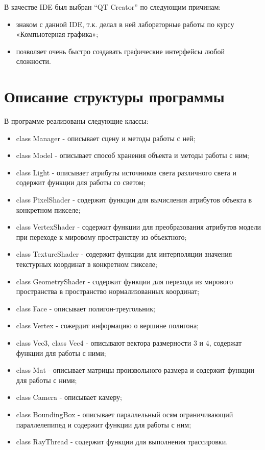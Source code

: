 \documentclass[12pt,a4paper,oneside]{report}
\begin{document}
	 В качестве IDE был выбран “QT Creator” по следующим причинам: 
	
	\begin{itemize}
		\item знаком с данной IDE, т.к. делал в ней лабораторные работы по курсу «Компьютерная графика»;
		\item позволяет очень быстро создавать графические интерфейсы любой сложности.
	\end{itemize}

	\section{Описание структуры программы}
	 \quad В программе реализованы следующие классы:
	\begin{itemize}
		\item class Manager - описывает сцену и методы работы с ней;
		\item class Model - описывает способ хранения объекта и методы работы с ним;
		\item class Light - описывает атрибуты источников света различного света и содержит функции для работы со светом;
		\item class PixelShader - содержит функции для вычисления атрибутов объекта в конкретном пикселе;
		\item class VertexShader - содержит функции для преобразования атрибутов модели при переходе к мировому пространству из объектного;
		\item class TextureShader - содержит функции для интерполяции значения текстурных координат в конкретном пикселе;
		\item class GeometryShader - содержит функции для перехода из мирового пространства в пространство нормализованных координат;
		\item class Face - описывает полигон-треугольник;
		\item class Vertex - сожердит информацию о вершине полигона;
		\item class Vec3, class Vec4 - описывают вектора размерности 3 и 4, содержат функции для работы с ними;
		\item class Mat -  описывает матрицы произвольного размера и содержит функции для работы с ними;
		\item class Camera - описывает камеру;
		\item class BoundingBox - описывает параллельный осям ограничивающий параллелепипед и содержит функции для работы с ним;
		\item class RayThread - содержит функции для выполнения трассировки.
	\end{itemize}
\end{document}
